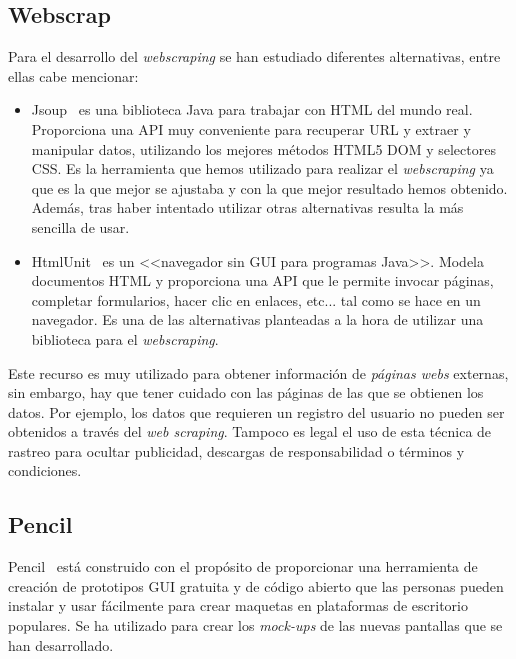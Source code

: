 \subsection{Webscrap}
Para el desarrollo del \emph{webscraping} se han estudiado diferentes alternativas, entre ellas cabe mencionar:
\begin{itemize}
	
\item Jsoup~\cite{jsoup} es una biblioteca Java para trabajar con HTML del mundo real. Proporciona una API muy conveniente para recuperar URL y extraer y manipular datos, utilizando los mejores métodos HTML5 DOM y selectores CSS. 
Es la herramienta que hemos utilizado para realizar el \emph{webscraping} ya que es la que mejor se ajustaba y con la que mejor resultado hemos obtenido. Además, tras haber intentado utilizar otras alternativas resulta la más sencilla de usar.


\item HtmlUnit~\cite{HTMLUNIT} es un <<navegador sin GUI para programas Java>>. Modela documentos HTML y proporciona una API que le permite invocar páginas, completar formularios, hacer clic en enlaces, etc... tal como se hace en un navegador. 
Es una de las alternativas planteadas a la hora de utilizar una biblioteca para el \emph{webscraping}.

\end{itemize}
Este recurso es muy utilizado para obtener información de \emph{páginas webs} externas, sin embargo, hay que tener cuidado con las páginas de las que se obtienen los datos. Por ejemplo, los datos que requieren un registro del usuario no pueden ser obtenidos a través del \emph{web scraping}.
Tampoco es legal el uso de esta técnica de rastreo para ocultar publicidad, descargas de responsabilidad o términos y condiciones.~\cite{webScrap}

\subsection{Pencil}
Pencil~\cite{Pencil_project} está construido con el propósito de proporcionar una herramienta de creación de prototipos GUI gratuita y de código abierto que las personas pueden instalar y usar fácilmente para crear maquetas en plataformas de escritorio populares. 
Se ha utilizado para crear los \emph{mock-ups} de las nuevas pantallas que se han desarrollado.

